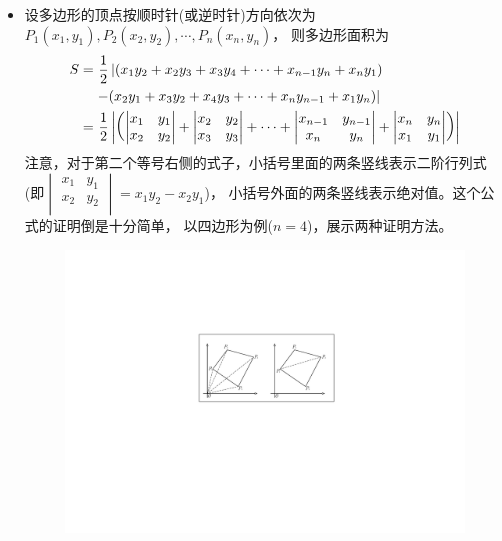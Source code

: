 \begin{itemize}[leftmargin=\inteval{\myitemleftmargin}pt,itemsep=
   \inteval{\myitemitempsep}pt,topsep=\inteval{\myitemtopsep}pt]
\item 设多边形的顶点按顺时针(或逆时针)方向依次为
$ P_1(x_1, y_1), P_2(x_2, y_2),\cdots, P_{n}(x_{n}, y_{n}) $，
则多边形面积为
\begin{align}\label{多边形面积公式}
    S=&\ \frac{1}{2}\left|(x_1y_2+x_2y_{3}+x_{3}y_{4}+\cdots+
    x_{n-1}y_{n}+ x_{n}y_1) \right. \notag \\ 
    & \left. -(x_2y_1+x_{3}y_2+x_{4}y_{3}+\cdots
    +x_{n}y_{n-1}+x_1y_{n})\right| \\
    =&\ \frac{1}{2} \left|\left(
    \begin{vmatrix}
        {x_1} & {y_1} \\
        {x_2} & {y_2} \\
    \end{vmatrix}+
    \begin{vmatrix}
        {x_2} & {y_2} \\
        {x_3} & {y_3} \\
    \end{vmatrix}+\cdots+
    \begin{vmatrix}
        {x_{n-1}} & {y_{n-1}} \\
        {x_{n}} & {y_{n}} \\
    \end{vmatrix}  +
    \begin{vmatrix}
        {x_{n}} & {y_{n}} \\
        {x_1} & {y_1} \\
    \end{vmatrix}   \right) \right|
\end{align}
注意，对于第二个等号右侧的式子，小括号里面的两条竖线表示二阶行列式
(即$ \begin{vmatrix}
    {x_1} & {y_1} \\
    {x_2} & {y_2} \\
\end{vmatrix}=x_1y_2-x_2y_1 $)，
小括号外面的两条竖线表示绝对值。这个公式的证明倒是十分简单，
以四边形为例($ n=4 $)，展示两种证明方法。
\begin{figure}[H]
    \centering
    \includegraphics[width=0.6\linewidth]{PDF_Picture/多边形面积公式}

\end{figure}
\end{itemize}
